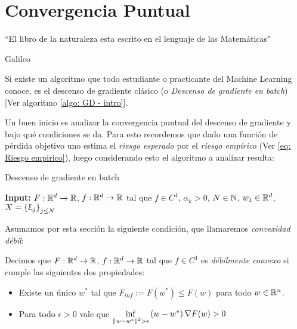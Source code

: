 \chapter{Convergencia Puntual }\label{ch:convergenciaPuntual}

\epigraph{“El libro de la naturaleza esta escrito en el lenguaje de las Matem\'aticas"}{Galileo}

Si existe un algoritmo que todo estudiante o practicante del Machine Learning conoce, es el descenso de gradiente cl\'asico (o \textit{Descenso de gradiente en batch}) [Ver algoritmo \ref{algo: GD - intro}].

Un buen inicio es analizar la convergencia puntual del descenso de gradiente y bajo qu\'e condiciones se da. Para esto recordemos que dado una funci\'on de p\'erdida objetivo uno estima el \textit{riesgo esperado} por el \textit{riesgo emp\'irico} (Ver \ref{eq: Riesgo empirico}), luego considerando esto el algoritmo a analizar resulta:

\LinesNumbered
\begin{algorithm}[H]
	\caption{Descenso de gradiente en batch \label{algo: GD}}
	\textbf{Input:} $F: {\mathbb{R}}^d \rightarrow {\mathbb{R}}$, $f:{\mathbb{R}}^d \rightarrow {\mathbb{R}}$ tal que $f \in C^1$, $\alpha_k >0$, $N \in {\mathbb{N}}$, $w_1 \in {\mathbb{R}}^d$, $X = \left\lbrace\upxi_j\right\rbrace_{j \leq N}$  \\
\end{algorithm}

Asumamos por esta secci\'on la siguiente condici\'on, que llamaremos \textit{convexidad d\'ebil}:

\begin{definition}
	\label{def: Debilmente convexo}
	Decimos que $F: {\mathbb{R}}^d \rightarrow {\mathbb{R}}$, $f:{\mathbb{R}}^d \rightarrow {\mathbb{R}}$ tal que $f \in C^1$ es \textit{d\'ebilmente convexo} si cumple las siguientes dos propiedades:
	
	\begin{itemize}
		\item Existe un \'unico $w^*$ tal que $F_{inf} := F(w^*) \leq F(w)$ para todo $w \in {\mathbb{R}}^n$.
		\item Para todo $\epsilon > 0$ vale que $\inf\limits_{\left\lVert w-w^*\right\rVert^2 > \epsilon} {\left(w - w^*\right) \nabla F(w) > 0}$
	\end{itemize}
	
\end{definition}

